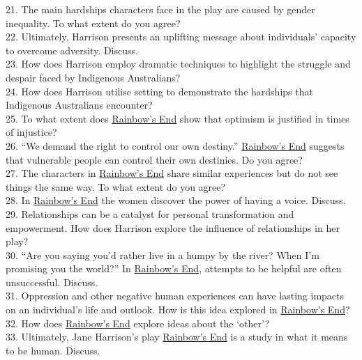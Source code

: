 \documentclass[a4paper]{article}
\begin{document}
21. The main hardships characters face in the play are caused by gender inequality. To what extent do you agree?\\

22. Ultimately, Harrison presents an uplifting message about individuals’ capacity to overcome adversity. Discuss.\\

23. How does Harrison employ dramatic techniques to highlight the struggle and despair faced by Indigenous Australians?\\

24. How does Harrison utilise setting to demonstrate the hardships that Indigenous Australians encounter?\\

25. To what extent does \underline{Rainbow’s End} show that optimism is justified in times of injustice?\\

26. “We demand the right to control our own destiny.” \underline{Rainbow’s End} suggests that vulnerable people can control their own destinies. Do you agree?\\

27. The characters in \underline{Rainbow’s End} share similar experiences but do not see things the same way. To what extent do you agree?\\

28. In \underline{Rainbow’s End} the women discover the power of having a voice. Discuss.\\

29. Relationships can be a catalyst for personal transformation and empowerment. How does Harrison explore the influence of relationships in her play?\\

30. “Are you saying you’d rather live in a humpy by the river? When I’m promising you the world?” In \underline{Rainbow’s End}, attempts to be helpful are often unsuccessful. Discuss.\\

31. Oppression and other negative human experiences can have lasting impacts on an individual’s life and outlook. How is this idea explored in \underline{Rainbow’s End}?\\

32. How does \underline{Rainbow’s End} explore ideas about the ‘other’?\\

33. Ultimately, Jane Harrison’s play \underline{Rainbow’s End} is a study in what it means to be human. Discuss.\\
\end{document}
